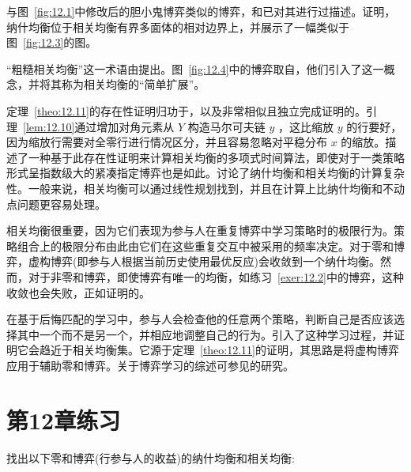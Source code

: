 与图~\ref{fig:12.1}中修改后的胆小鬼博弈类似的博弈，\citet[p.~72]{aumann1974}和\citet[p.~250]{myerson1991}已对其进行过描述。\citet*{nau2004}证明，纳什均衡位于相关均衡有界多面体的相对边界上，并展示了一幅类似于图~\ref{fig:12.3}的图。

“粗糙相关均衡”这一术语由\citet{young2004}提出。图~\ref{fig:12.4}中的博弈取自\citet[p.~205]{moulin1978}，他们引入了这一概念，并将其称为相关均衡的“简单扩展”。

定理~\ref{theo:12.11}的存在性证明归功于\citet{hart1989}，以及非常相似且独立完成证明的\citet{nau1990}。引理~\ref{lem:12.10}通过增加对角元素从 \(Y\) 构造马尔可夫链 \(y\) ，这比缩放 \(y\) 的行要好，因为缩放行需要对全零行进行情况区分，并且容易忽略对平稳分布 \(x\) 的缩放。\citet{papadimitriou2008}描述了一种基于此存在性证明来计算相关均衡的多项式时间算法，即使对于一类策略形式呈指数级大的紧凑指定博弈也是如此。\citet{gilboa1989}讨论了纳什均衡和相关均衡的计算复杂性。一般来说，相关均衡可以通过线性规划找到，并且在计算上比纳什均衡和不动点问题更容易处理。

相关均衡很重要，因为它们表现为参与人在重复博弈中学习策略时的极限行为。策略组合上的极限分布由此由它们在这些重复交互中被采用的频率决定。对于零和博弈，虚构博弈(即参与人根据当前历史使用最优反应)会收敛到一个纳什均衡\citep{robinson1951}。然而，对于非零和博弈，即使博弈有唯一的均衡，如练习~\ref{exer:12.2}中的博弈，这种收敛也会失败，正如\citet{shapley1963}证明的。

在基于后悔匹配的学习中，参与人会检查他的任意两个策略，判断自己是否应该选择其中一个而不是另一个，并相应地调整自己的行为。\citet{hart2000}引入了这种学习过程，并证明它会趋近于相关均衡集。它源于定理~\ref{theo:12.11}的证明，其思路是将虚构博弈应用于辅助零和博弈\citep[p.~1142]{hart2000}。关于博弈学习的综述可参见\citet{young2004}的研究。


\section{第12章练习}\label{sec12.7}

\begin{exercise}\label{exer:12.1}
找出以下零和博弈(行参与人的收益)的纳什均衡和相关均衡:

\begin{center}
\end{center}
\end{exercise}

